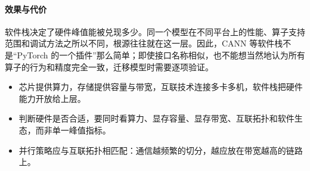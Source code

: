 \paragraph{效果与代价} 软件栈决定了硬件峰值能被兑现多少。同一个模型在不同平台上的性能、算子支持范围和调试方法之所以不同，根源往往就在这一层。因此，CANN 等软件栈不是“PyTorch 的一个插件”那么简单；即使接口名称相似，也不能想当然地认为所有算子的行为和精度完全一致，迁移模型时需要逐项验证。

\begin{keypoints}
\begin{itemize}[leftmargin=1.5em]
  \item 芯片提供算力，存储提供容量与带宽，互联技术连接多卡多机，软件栈把硬件能力开放给上层。
  \item 判断硬件是否合适，要同时看算力、显存容量、显存带宽、互联拓扑和软件生态，而非单一峰值指标。
  \item 并行策略应与互联拓扑相匹配：通信越频繁的切分，越应放在带宽越高的链路上。
\end{itemize}
\end{keypoints}
